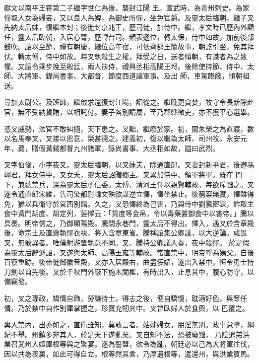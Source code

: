 \begin{pinyinscope}
 獻文以南平王霄第二子繼字世仁為後，襲封江陽
 王。宣武時，為青州刺史。為家僮取人女為婦妾，又以良人為婢，為御史所彈，坐免官爵。及靈太后臨朝，繼子叉先納太后妹，復繼本封；後徙封京兆王，歷司徒，加侍中。繼，孝文時已歷內外顯任，靈太后臨朝，入居心膂，歷轉台司。頻表遜位，轉太保，侍中如故，加前後部鼓吹。詔以至節，禮有朝慶，繼位高年宿，可依齊郡王簡故事，朝訖引坐，免其拜伏。轉太傅，侍中如故。時叉執殺生之權，拜受之日，送者傾朝，有識者為之致懼。又詔令乘步挽至殿廷，兩人扶侍，禮與丞相高陽王埒。後除使持節、侍中、太師、大將軍、錄尚書事、大都督、節度西道諸軍事。及出
 師，車駕臨餞，傾朝祖送。



 尋加太尉公。及班師，繼啟求還復封江陽，詔從之。繼晚更貪婪，牧守令長新除赴官，無不受納貨賄，以相託付。妻子各別請屬，至乃郡縣微吏，亦不獲平心選舉。



 憑叉威勢，法官不敢糾擿，天下患之。叉黜，繼廢於家。初，爾朱榮之為直寢，數以名馬奉叉，叉接以恩意，榮甚德之。建義初，復以繼為太師、司州牧。永安元年，薨，贈假黃鉞都督九州諸軍，錄尚書事、大丞相如故，謚曰武烈。



 叉字伯俊，小字夜叉。靈太后臨朝，以叉妹夫，除通直郎。叉妻封新平君，後遷馮翊君，拜女侍中。叉女夭，靈太后詔贈鄉主。叉累加侍中、領軍將軍。既在
 門下，兼總禁兵，深為靈太后所信委。太傅、清河王懌以親賢輔政，每欲斥黜之。叉遂令通直郎宋維，告司染都尉韓文殊欲謀逆立懌，懌坐禁止。後窮案無實，懌雖得免，猶以兵衛守於宮西別館。久之，叉恐懌終為己害，乃與侍中劉騰密謀，詐取主食中黃門胡度、胡定列，誣懌云：「貨度等金帛，令以毒藥置御食中以害帝。」騰以具奏。明帝信之，乃御顯陽殿。騰閉永巷門，靈太后不得出。懌入，遇叉於含章殿後，命宗士及直齋執懌衣袂，將入含章東省。騰稱詔集公卿議，以大逆論。咸畏叉，無敢異者。唯僕射游肇執意不同。叉、騰持公卿議入奏，夜中殺懌。
 於是假為靈太后辭遜詔，叉遂與太師、高陽王雍等輔政。常直禁中，明帝呼為姨父。自後百寮重跡。後帝徙御徽音殿，叉亦入居殿右，曲盡佞媚，遂出入禁中，恒令勇士持刀劍以自先後。叉於千秋門外廠下施木闌檻，有時出入，止息其中，腹心防守，以備竊發。



 初，叉之專政，矯情自飾，勞謙待士。得志之後，便自驕愎，耽酒好色，與奪任情。乃於禁中自作別庫掌握之，珍寶充牣其中。叉曾臥婦人於食輿，以巴覆之。



 輿入禁內，出亦如之，直衛雖知，莫敢言者。姑姊婦女，朋淫無別。政事怠墮，綱紀不舉。州鎮多非其人，於是天下遂亂矣。叉自知不法，恐被廢黜，
 乃陰遣弟洪業召武州人姬庫根等與之聚宴。遂為誓盟，欲令為亂，朝廷必以己為大將軍往伐，因以共為表裏，如此可得自立。根等然其言，乃厚遺根等，遣還州，與洪業買馬。




\end{pinyinscope}
